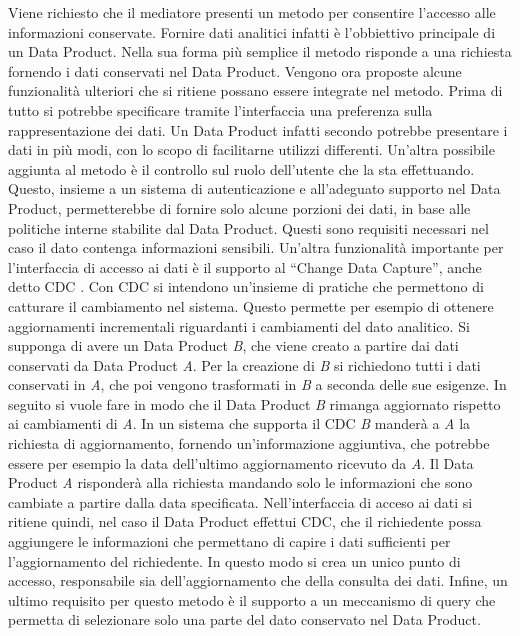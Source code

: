 \documentclass[12pt]{report}
\begin{document}
Viene richiesto che il mediatore presenti un metodo per consentire l'accesso alle informazioni conservate. 
Fornire dati analitici infatti è l'obbiettivo principale di un Data Product.
Nella sua forma più semplice il metodo risponde a una richiesta fornendo i dati conservati nel Data Product.
Vengono ora proposte alcune funzionalità ulteriori che si ritiene possano essere integrate nel metodo.
Prima di tutto si potrebbe specificare tramite l'interfaccia una preferenza sulla rappresentazione dei dati. 
Un Data Product infatti secondo \cite{zhamak_dehgani_data_2023} potrebbe presentare i dati in più modi, con lo scopo di facilitarne utilizzi differenti.
Un'altra possibile aggiunta al metodo è il controllo sul ruolo dell'utente che la sta effettuando. 
Questo, insieme a un sistema di autenticazione e all'adeguato supporto nel Data Product, permetterebbe di fornire solo alcune porzioni dei dati, in base alle politiche interne stabilite dal Data Product.
Questi sono requisiti necessari nel caso il dato contenga informazioni sensibili.
Un'altra funzionalità importante per l'interfaccia di accesso ai dati è il supporto al ``Change Data Capture'', anche detto CDC \cite{eventSourcing,petrie2018streaming}.
Con CDC si intendono un'insieme di pratiche che permettono di catturare il cambiamento nel sistema.
Questo permette per esempio di ottenere aggiornamenti incrementali riguardanti i cambiamenti del dato analitico.
Si supponga di avere un Data Product \textit{B}, che viene creato a partire dai dati conservati da Data Product \textit{A}. 
Per la creazione di \textit{B} si richiedono tutti i dati conservati in \textit{A}, che poi vengono trasformati in \textit{B} a seconda delle sue esigenze.
In seguito si vuole fare in modo che il Data Product \textit{B} rimanga aggiornato rispetto ai cambiamenti di \textit{A}.
In un sistema che supporta il CDC \textit{B} manderà a \textit{A} la richiesta di aggiornamento, fornendo un'informazione aggiuntiva, che potrebbe essere per esempio la data dell'ultimo aggiornamento ricevuto da \textit{A}.
Il Data Product \textit{A} risponderà alla richiesta mandando solo le informazioni che sono cambiate a partire dalla data specificata.
Nell'interfaccia di acceso ai dati si ritiene quindi, nel caso il Data Product effettui CDC, che il richiedente possa aggiungere le informazioni che permettano di capire i dati sufficienti per l'aggiornamento del richiedente.
In questo modo si crea un unico punto di accesso, responsabile sia dell'aggiornamento che della consulta dei dati.
Infine, un ultimo requisito per questo metodo è il supporto a un meccanismo di query che permetta di selezionare solo una parte del dato conservato nel Data Product.
\end{document}
